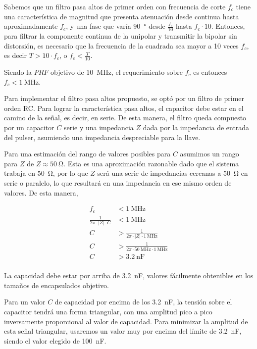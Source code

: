Sabemos que un filtro pasa altos de primer orden con frecuencia de corte $f_c$
tiene una característica de magnitud que presenta atenuación desde continua hasta
aproximadamente $f_c$, y una fase que varía \qty{90}{\degree} desde
$\frac{f_c}{10}$ hasta $f_c \cdot 10$. Entonces, para filtrar la componente
continua de la unipolar y transmitir la bipolar sin distorsión,
es necesario que la frecuencia de la cuadrada sea mayor a 10 veces $f_c$, es
decir $T > 10 \cdot f_c$, o $f_c < \frac{T}{10}$.

Siendo la $PRF$ objetivo de \qty{10}{\mega\hertz}, el requerimiento sobre $f_c$
es entonces $f_c < \qty{1}{\mega\hertz}$.

Para implementar el filtro pasa altos propuesto, se optó por un filtro de primer
orden RC. Para lograr la característica pasa altos, el capacitor debe estar en
el camino de la señal, es decir, en serie. De esta manera, el filtro queda
compuesto por un capacitor $C$ serie y una impedancia $Z$ dada por la impedancia
de entrada del pulser, asumiendo una impedancia despreciable para la llave.

Para una estimación del rango de valores posibles para $C$ asumimos un rango
para $Z$ de $ Z \approx \qty{50}{\ohm}$. Esta es una aproximación razonable dado
que el sistema trabaja en \qty{50}{\ohm}, por lo que $Z$ será una serie de
impedancias cercanas a \qty{50}{\ohm} en serie o paralelo, lo que resultará en
una impedancia en ese mismo orden de valores. De esta manera,

\begin{equation}
    \begin{aligned}
        f_c &< \qty{1}{\mega\hertz} \\
        \frac{1}{2\pi \cdot |Z| \cdot C} &< \qty{1}{\mega\hertz} \\
        C &> \frac{1}{2\pi \cdot |Z| \cdot \qty{1}{\mega\hertz}} \\
        C &> \frac{1}{2\pi \cdot \qty{50}{\mega\hertz} \cdot \qty{1}{\mega\hertz}} \\
        C &> \qty{3.2}{\nano\farad} \\
    \end{aligned}
\end{equation}

La capacidad debe estar por arriba de \qty{3.2}{\nano\farad}, valores fácilmente
obtenibles en los tamaños de encapsulados objetivo.

Para un valor $C$ de capacidad por encima de los \qty{3.2}{\nano\farad}, la
tensión sobre el capacitor tendrá una forma triangular, con una amplitud pico a
pico inversamente proporcional al valor de capacidad. Para minimizar la amplitud
de esta señal triangular, usaremos un valor muy por encima del límite de
\qty{3.2}{\nano\farad}, siendo el valor elegido de \qty{100}{\nano\farad}.

